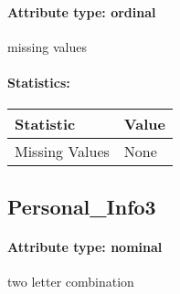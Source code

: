 \paragraph{Attribute type: ordinal} missing values
\paragraph{Statistics: }
\begin{table}[H]
	\renewcommand{\arraystretch}{1.25}
	\begin{tabular}{l|l}
		\textbf{Statistic} & \textbf{Value}\\\hline
		Missing Values& None\\\hline
	\end{tabular}
\end{table}

\subsection{Personal\_Info3}
\paragraph{Attribute type: nominal} two letter combination
